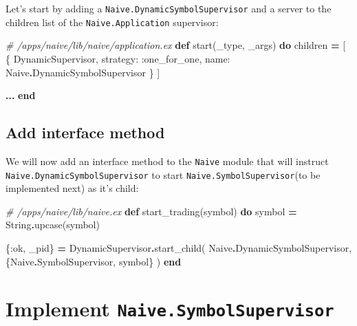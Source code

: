 \documentclass[
  oneside]{book}
\newenvironment{Shaded}{\begin{snugshade}}{\end{snugshade}}
\newcommand{\CommentTok}[1]{\textcolor[rgb]{0.56,0.35,0.01}{\textit{#1}}}
\newcommand{\ConstantTok}[1]{\textcolor[rgb]{0.00,0.00,0.00}{#1}}
\newcommand{\KeywordTok}[1]{\textcolor[rgb]{0.13,0.29,0.53}{\textbf{#1}}}
\newcommand{\NormalTok}[1]{#1}
\newcommand{\OperatorTok}[1]{\textcolor[rgb]{0.81,0.36,0.00}{\textbf{#1}}}
\newcommand{\VariableTok}[1]{\textcolor[rgb]{0.00,0.00,0.00}{#1}}
\begin{document}
Let's start by adding a \texttt{Naive.DynamicSymbolSupervisor} and a server to the children list of the \texttt{Naive.Application} supervisor:

\begin{Shaded}
\begin{Highlighting}[]
  \CommentTok{\# /apps/naive/lib/naive/application.ex}
  \KeywordTok{def}\NormalTok{ start(\_type, \_args) }\KeywordTok{do}
\NormalTok{    children }\OperatorTok{=}\NormalTok{ [}
\NormalTok{      \{}
        \ConstantTok{DynamicSupervisor}\NormalTok{,}
        \VariableTok{strategy:} \VariableTok{:one\_for\_one}\NormalTok{,}
        \VariableTok{name:} \ConstantTok{Naive}\OperatorTok{.}\ConstantTok{DynamicSymbolSupervisor}
\NormalTok{      \}}
\NormalTok{    ]}

    \OperatorTok{...}
  \KeywordTok{end}
\end{Highlighting}
\end{Shaded}

\hypertarget{add-interface-method}{%
\subsection{Add interface method}\label{add-interface-method}}

We will now add an interface method to the \texttt{Naive} module that will instruct \texttt{Naive.DynamicSymbolSupervisor} to start \texttt{Naive.SymbolSupervisor}(to be implemented next) as it's child:

\begin{Shaded}
\begin{Highlighting}[]
  \CommentTok{\# /apps/naive/lib/naive.ex}
  \KeywordTok{def}\NormalTok{ start\_trading(symbol) }\KeywordTok{do}
\NormalTok{    symbol }\OperatorTok{=} \ConstantTok{String}\OperatorTok{.}\NormalTok{upcase(symbol)}

\NormalTok{    \{}\VariableTok{:ok}\NormalTok{, \_pid\} }\OperatorTok{=}
      \ConstantTok{DynamicSupervisor}\OperatorTok{.}\NormalTok{start\_child(}
        \ConstantTok{Naive}\OperatorTok{.}\ConstantTok{DynamicSymbolSupervisor}\NormalTok{,}
\NormalTok{        \{}\ConstantTok{Naive}\OperatorTok{.}\ConstantTok{SymbolSupervisor}\NormalTok{, symbol\}}
\NormalTok{      )}
  \KeywordTok{end}
\end{Highlighting}
\end{Shaded}

\hypertarget{implement-naive.symbolsupervisor}{%
\section{\texorpdfstring{Implement \texttt{Naive.SymbolSupervisor}}{Implement Naive.SymbolSupervisor}}\label{implement-naive.symbolsupervisor}}
\end{document}
